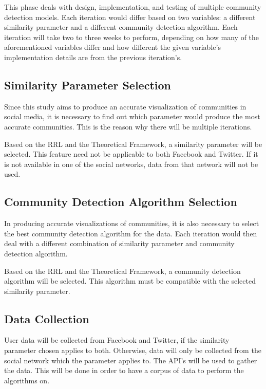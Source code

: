 This phase deals with design, implementation, and testing of multiple community detection models. Each iteration would differ based on two variables: a different similarity parameter and a different community detection algorithm. Each iteration will take two to three weeks to perform, depending on how many of the aforementioned variables differ and how different the given variable’s implementation details are from the previous iteration’s.

\subsection{Similarity Parameter Selection}

Since this study aims to produce an accurate visualization of communities in social media, it is necessary to find out which parameter would produce the most accurate communities. This is the reason why there will be multiple iterations. 

Based on the RRL and the Theoretical Framework, a similarity parameter will be selected. This feature need not be applicable to both Facebook and Twitter. If it is not available in one of the social networks, data from that network will not be used.

\subsection{Community Detection Algorithm Selection}

In producing accurate visualizations of communities, it is also necessary to select the best community detection algorithm for the data. Each iteration would then deal with a different combination of similarity parameter and community detection algorithm.

Based on the RRL and the Theoretical Framework, a community detection algorithm will be selected. This algorithm must be compatible with the selected similarity parameter.

\subsection{Data Collection}

User data will be collected from Facebook and Twitter, if the similarity parameter chosen applies to both. Otherwise, data will only be collected from the social network which the parameter applies to. The API’s will be used to gather the data. This will be done in order to have a corpus of data to perform the algorithms on.

